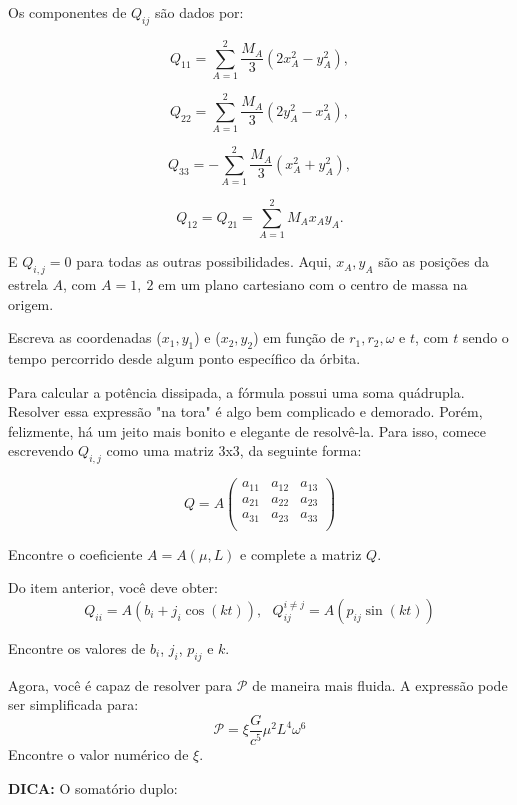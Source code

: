 \documentclass[11pt]{article}
\begin{document}
\begin{pproblem}
\begin{alternativas}
    Os componentes de \( Q_{ij} \) são dados por:

    \[
    Q_{11} = \sum_{A=1}^2 \frac{M_A}{3} \left( 2x_A^2 - y_A^2 \right),
    \]

    \[
    Q_{22} = \sum_{A=1}^2 \frac{M_A}{3} \left( 2y_A^2 - x_A^2 \right),
    \]

    \[
    Q_{33} = -\sum_{A=1}^2 \frac{M_A}{3} \left( x_A^2 + y_A^2 \right),
    \]

    \[
    Q_{12} = Q_{21} = \sum_{A=1}^2 M_A x_A y_A.
    \]

    E \(Q_{i,j} = 0\) para todas as outras possibilidades. Aqui, \(x_A, y_A\) são as posições da estrela \(A\), com \(A=1,\ 2\) em um plano cartesiano com o centro de massa na origem.

    \item Escreva as coordenadas (\(x_1, y_1\)) e (\(x_2, y_2\)) em função de \(r_1, r_2, \omega\) e \(t\), com \(t\) sendo o tempo percorrido desde algum ponto específico da órbita.
    
    \item Para calcular a potência dissipada, a fórmula possui uma soma quádrupla. Resolver essa expressão "na tora" é algo bem complicado e demorado. Porém, felizmente, há um jeito mais bonito e elegante de resolvê-la. Para isso, comece escrevendo \(Q_{i,j}\) como uma matriz 3x3, da seguinte forma:
    
    \[Q = A\left(\begin{matrix}
        a_{11} & a_{12} & a_{13} \\
        a_{21} & a_{22} & a_{23} \\
        a_{31} & a_{23} & a_{33} \\
    \end{matrix}\right)\]

    Encontre o coeficiente \(A = A(\mu, L)\) e complete a matriz \(Q\).

    \item Do item anterior, você deve obter:
    \[Q_{ii} = A(b_i + j_i\cos(k t)), \ \ \ Q_{ij}^{i\neq j}= A(p_{ij} \sin(kt)) \]

    Encontre os valores de \(b_i\), \(j_i\), \(p_{ij}\) e \(k\).

    \item Agora, você é capaz de resolver para \(\mathcal{P}\) de maneira mais fluida. A expressão pode ser simplificada para:
    \[\mathcal{P} = \xi \frac{G}{c^5}\mu^2L^4\omega^6\]
    Encontre o valor numérico de \(\xi\).

    \textbf{DICA: } O somatório duplo:


\end{alternativas}
\end{pproblem}
\end{document}

